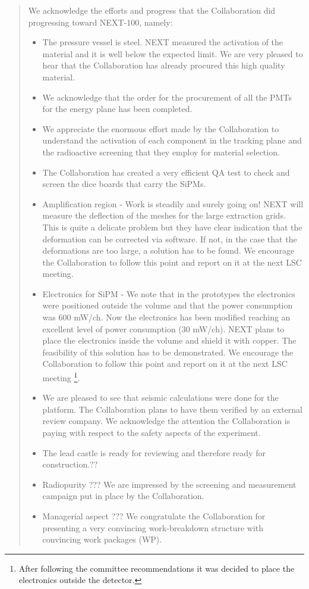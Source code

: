 \begin{quotation}
We acknowledge the efforts and progress that the Collaboration did progressing toward NEXT-100, namely:
\begin{itemize}
\item The pressure vessel is steel. NEXT measured the activation of the material and it is well below the expected limit. We are very pleased to hear that the Collaboration has already procured this high quality material. 
\item We acknowledge that the order for the procurement of all the PMTs for the energy plane has been completed.
\item We appreciate the enormous effort made by the Collaboration to understand the activation of each component in the tracking plane and the radioactive screening that they employ for material selection.
\item The Collaboration has created a very efficient QA test to check and screen the dice boards that carry the SiPMs.
\item Amplification region - Work is steadily and surely going on! NEXT will measure the deflection of the meshes for the large extraction grids. This is quite a delicate problem but they have clear indication that the deformation can be corrected via software. If not, in the case that the deformations are too large, a solution has to be found. We encourage the Collaboration to follow this point and report on it at the next LSC meeting.
\item Electronics for SiPM - We note that in the prototypes the electronics were positioned outside the volume and that the power consumption was 600 mW/ch. Now the electronics has been modified reaching an excellent level of power consumption (30 mW/ch). NEXT plans to place the electronics inside the volume and shield it with copper. The feasibility of this solution has to be demonstrated.  We encourage the Collaboration to follow this point and report on it at the next LSC meeting \footnote{After following the committee recommendations it was decided to place the electronics outside the detector.}.
\item We are pleased to see that seismic calculations were done for the platform. The Collaboration plans to have them verified by an external review company. We acknowledge the attention the Collaboration is paying with respect to the safety aspects of the experiment.
\item The lead castle is ready for reviewing and therefore ready for construction.??
\item Radiopurity ??? We are impressed by the screening and measurement campaign put in place by the Collaboration.
\item Managerial aspect ??? We congratulate the Collaboration for presenting a very convincing work-breakdown structure with convincing work packages (WP).
\end{itemize}
	

\end{quotation}
